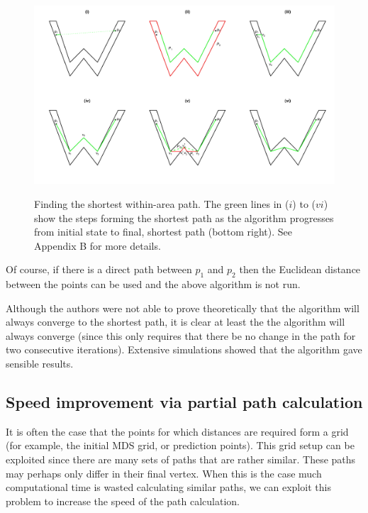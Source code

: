 \documentclass[useAMS, referee]{biom}
\begin{document}
\begin{figure}
\includegraphics[angle=90, height=\textheight,trim=0in 0.5in 0in 0.25in]{figs/wdia.pdf} \\
\label{wdia}
\caption{Finding the shortest within-area path. The green lines in ($i$) to ($vi$) show the steps forming the shortest path as the algorithm progresses from initial state to final, shortest path (bottom right). See Appendix B for more details.}
\end{figure}




Of course, if there is a direct path between $p_1$ and $p_2$ then the Euclidean distance between the points can be used and the above algorithm is not run.

Although the authors were not able to prove theoretically that the algorithm will always converge to the shortest path, it is clear at least the the algorithm will always converge (since this only requires that there be no change in the path for two consecutive iterations). Extensive simulations showed that the algorithm gave sensible results.


\subsection*{Speed improvement via partial path calculation}

It is often the case that the points for which distances are required form a grid (for example, the initial MDS grid, or prediction points). This grid setup can be exploited since there are many sets of paths that are rather similar. These paths may perhaps only differ in their final vertex. When this is the case much computational time is wasted calculating similar paths, we can exploit this problem to increase the speed of the path calculation.
\end{document}
